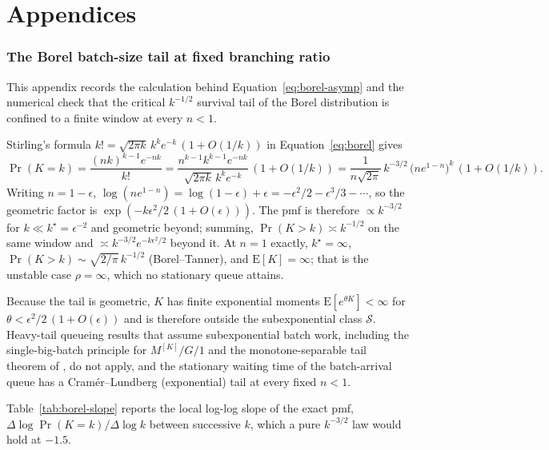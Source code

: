 \documentclass[11pt]{article}
\begin{document}
\clearpage
\part*{Appendices}
\appendix



\section{The Borel batch-size tail at fixed branching ratio}
\label{app:borel}

This appendix records the calculation behind Equation~\eqref{eq:borel-asymp} and the
numerical check that the critical $k^{-1/2}$ survival tail of the Borel distribution is
confined to a finite window at every $n < 1$.

Stirling's formula $k! = \sqrt{2\pi k}\, k^k e^{-k}\,(1 + O(1/k))$ in
Equation~\eqref{eq:borel} gives
\[
\Pr(K = k) = \frac{(nk)^{k-1} e^{-nk}}{k!} = \frac{n^{k-1} k^{k-1} e^{-nk}}{\sqrt{2\pi
k}\, k^k e^{-k}}\,(1 + O(1/k)) = \frac{1}{n\sqrt{2\pi}}\, k^{-3/2}\, \big(n
e^{1-n}\big)^{k}\,(1 + O(1/k)).
\]
Writing $n = 1 - \epsilon$, $\log(n e^{1-n}) = \log(1-\epsilon) + \epsilon = -\epsilon^2/2
- \epsilon^3/3 - \cdots$, so the geometric factor is $\exp(-k\epsilon^2/2\,(1 +
O(\epsilon)))$. The pmf is therefore $\propto k^{-3/2}$ for $k \ll k^\star =
\epsilon^{-2}$ and geometric beyond; summing, $\Pr(K > k) \asymp k^{-1/2}$ on the same
window and $\asymp k^{-3/2} e^{-k\epsilon^2/2}$ beyond it. At $n = 1$ exactly, $k^\star =
\infty$, $\Pr(K > k) \sim \sqrt{2/\pi}\, k^{-1/2}$ (Borel--Tanner), and $\mathrm{E}[K] =
\infty$; that is the unstable case $\rho = \infty$, which no stationary queue attains.

Because the tail is geometric, $K$ has finite exponential moments $\mathrm{E}[e^{\theta
K}] < \infty$ for $\theta < \epsilon^2/2\,(1 + O(\epsilon))$ and is therefore outside the
subexponential class $\mathcal{S}$. Heavy-tail queueing results that assume subexponential
batch work, including the single-big-batch principle for $M^{[K]}/G/1$ and the
monotone-separable tail theorem of \citet{baccellifosslelarge2005}, do not apply, and the
stationary waiting time of the batch-arrival queue has a Cram\'er--Lundberg (exponential)
tail at every fixed $n < 1$.

Table~\ref{tab:borel-slope} reports the local log-log slope of the exact pmf, $\Delta \log
\Pr(K = k) / \Delta \log k$ between successive $k$, which a pure $k^{-3/2}$ law would hold
at $-1.5$.
\end{document}
